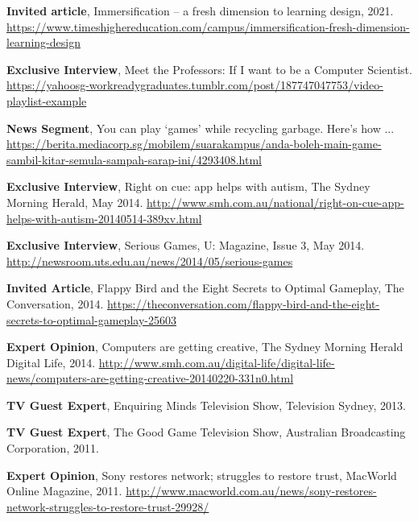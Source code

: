 \documentclass[10pt,a4paper]{article}
\renewenvironment{itemize}{
    \begin{list}{}{
            \setlength{\leftmargin}{1.5em}
            \setlength{\itemsep}{0.25em}
            \setlength{\parskip}{0pt}
            \setlength{\parsep}{0.25em}
        }
        }{
    \end{list}
}
\begin{document}
\begin{itemize}
 
    \item \textbf{Invited article}, Immersification – a fresh dimension to learning design, 2021. \url{https://www.timeshighereducation.com/campus/immersification-fresh-dimension-learning-design}

    \item \textbf{Exclusive Interview}, Meet the Professors: If I want to be a Computer Scientist. \url{https://yahoosg-workreadygraduates.tumblr.com/post/187747047753/video-playlist-example} 

    \item \textbf{News Segment}, You can play `games' while recycling garbage. Here's how ... \url{https://berita.mediacorp.sg/mobilem/suarakampus/anda-boleh-main-game-sambil-kitar-semula-sampah-sarap-ini/4293408.html} 

    \item \textbf{Exclusive Interview}, Right on cue: app helps with autism, The Sydney Morning Herald, May 2014. \url{http://www.smh.com.au/national/right-on-cue-app-helps-with-autism-20140514-389xv.html}

    \item \textbf{Exclusive Interview}, Serious Games, U: Magazine, Issue 3, May 2014. \url{http://newsroom.uts.edu.au/news/2014/05/serious-games}

    \item \textbf{Invited Article}, Flappy Bird and the Eight Secrets to Optimal Gameplay, The Conversation, 2014. \url{https://theconversation.com/flappy-bird-and-the-eight-secrets-to-optimal-gameplay-25603}

    \item \textbf{Expert Opinion}, Computers are getting creative, The Sydney Morning Herald Digital Life, 2014. \url{http://www.smh.com.au/digital-life/digital-life-news/computers-are-getting-creative-20140220-331n0.html}

    \item \textbf{TV Guest Expert}, Enquiring Minds Television Show, Television Sydney, 2013.

    \item \textbf{TV Guest Expert}, The Good Game Television Show, Australian Broadcasting Corporation, 2011.

    \item \textbf{Expert Opinion}, Sony restores network; struggles to restore trust, MacWorld Online Magazine, 2011. \url{http://www.macworld.com.au/news/sony-restores-network-struggles-to-restore-trust-29928/}

\end{itemize}
\end{document}

